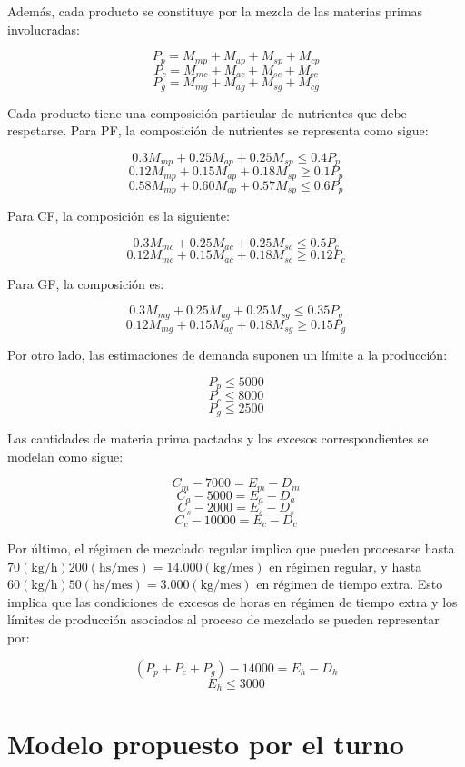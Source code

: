 \documentclass[a4paper,11pt]{article}
\begin{document}
Además, cada producto se constituye por la mezcla de las materias primas
involucradas:

\[
  P_p = M_{mp} + M_{ap} + M_{sp} + M_{cp}
\]
\[
  P_c = M_{mc} + M_{ac} + M_{sc} + M_{cc}
\]
\[
  P_g = M_{mg} + M_{ag} + M_{sg} + M_{cg}
\]

Cada producto tiene una composición particular de nutrientes que debe
respetarse. Para PF, la composición de nutrientes se representa como sigue:

\[
  0.3 M_{mp} + 0.25 M_{ap} + 0.25 M_{sp} \leq 0.4 P_p
\]
\[
  0.12 M_{mp} + 0.15 M_{ap} + 0.18 M_{sp} \geq 0.1 P_p
\]
\[
  0.58 M_{mp} + 0.60 M_{ap} + 0.57 M_{sp} \leq 0.6 P_p
\]

Para CF, la composición es la siguiente:

\[
  0.3 M_{mc} + 0.25 M_{ac} + 0.25 M_{sc} \leq 0.5 P_c
\]
\[
  0.12 M_{mc} + 0.15 M_{ac} + 0.18 M_{sc} \geq 0.12 P_c
\]

Para GF, la composición es:

\[
  0.3 M_{mg} + 0.25 M_{ag} + 0.25 M_{sg} \leq 0.35 P_g
\]
\[
  0.12 M_{mg} + 0.15 M_{ag} + 0.18 M_{sg} \geq 0.15 P_g
\]

Por otro lado, las estimaciones de demanda suponen un límite a la producción:

\[
  P_p \leq 5000
\]
\[
  P_c \leq 8000
\]
\[
  P_g \leq 2500
\]

Las cantidades de materia prima pactadas y los excesos correspondientes se
modelan como sigue:

\[
  C_m - 7000 = E_m - D_m
\]
\[
  C_a - 5000 = E_a - D_a
\]
\[
  C_s - 2000 = E_s - D_s
\]
\[
  C_c - 10000 = E_c - D_c
\]

Por último, el régimen de mezclado regular implica que pueden procesarse hasta
\(70 (\text{kg} / \text{h}) 200 (\text{hs} / \text{mes}) = 14.000 (\text{kg} /
\text{mes})\) en régimen regular, y hasta \(60 (\text{kg} / \text{h}) 50
(\text{hs} / \text{mes}) = 3.000 (\text{kg} / \text{mes})\) en régimen de
tiempo extra. Esto implica que las condiciones de excesos de horas en régimen
de tiempo extra y los límites de producción asociados al proceso de mezclado
se pueden representar por:

\[
  (P_p + P_c + P_g) - 14000 = E_h - D_h
\]
\[
  E_h \leq 3000
\]

\clearpage
\part{Modelo propuesto por el turno}
\end{document}

